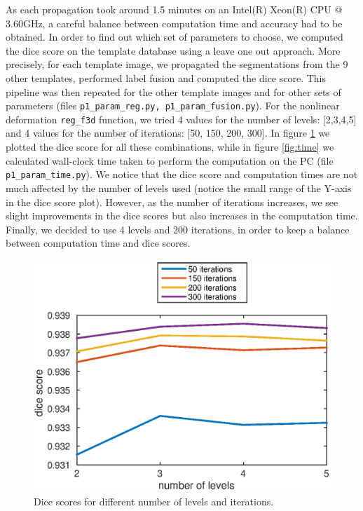 \documentclass[11pt,a4paper,oneside]{report}
\begin{document}
As each propagation took around 1.5 minutes on an Intel(R) Xeon(R) CPU @ 3.60GHz, a careful balance between computation time and accuracy had to be obtained. In order to find out which set of parameters to choose, we computed the dice score on the template database using a leave one out approach. More precisely, for each template image, we propagated the segmentations from the 9 other templates, performed label fusion and computed the dice score. This pipeline was then repeated for the other template images and for other sets of parameters (files \texttt{p1\_param\_reg.py, p1\_param\_fusion.py}). For the nonlinear deformation \texttt{reg\_f3d} function, we tried 4 values for the number of levels: [2,3,4,5] and 4 values for the number of iterations: [50, 150, 200, 300]. In figure \ref{fig:dice} we plotted the dice score for all these combinations, while in figure \ref{fig:time} we calculated wall-clock time taken to perform the computation on the PC (file \texttt{p1\_param\_time.py}).
We notice that the dice score and computation times are not much affected by the number of levels used (notice the small range of the Y-axis in the dice score plot). However, as the number of iterations increases, we see slight improvements in the dice scores but also increases in the computation time. Finally, we decided to use 4 levels and 200 iterations, in order to keep a balance between computation time and dice scores.

\begin{figure}
 \centering
 \includegraphics[scale=0.8]{figures/dice_params.eps}
 \caption{Dice scores for different number of levels and iterations.}
 \label{fig:dice}
\end{figure}
\end{document}
